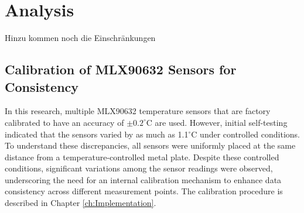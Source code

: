 
\chapter{Analysis}
\label{ch:Analysis}

Hinzu kommen noch die Einschränkungen

\section{Calibration of MLX90632 Sensors for Consistency}
In this research, multiple MLX90632 temperature sensors that are factory calibrated to have an accuracy of $\pm0.2^\circ$C are used. 
However, initial self-testing indicated that the sensors varied by as much as 1.1$^\circ$C under controlled conditions. 
To understand these discrepancies, all sensors were uniformly placed at the same distance from a temperature-controlled metal plate. 
Despite these controlled conditions, significant variations among the sensor readings were observed, underscoring the need for an internal calibration mechanism to enhance data consistency across different measurement points.
The calibration procedure is described in Chapter \ref{ch:Implementation}.

